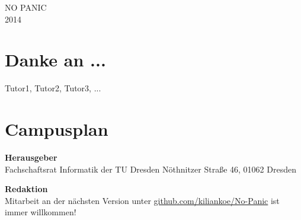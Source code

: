 \documentclass[12pt]{article}
\begin{document}
NO PANIC \\
2014
\newpage


\tableofcontents


\section{Danke an ...}

Tutor1, Tutor2, Tutor3, ...


















\section{Campusplan}


\newpage
\textbf{Herausgeber} \\
Fachschaftsrat Informatik der TU Dresden
Nöthnitzer Straße 46, 01062 Dresden

\textbf{Redaktion} \\

Mitarbeit an der nächsten Version unter \url{github.com/kiliankoe/No-Panic} ist immer willkommen!
\end{document}
